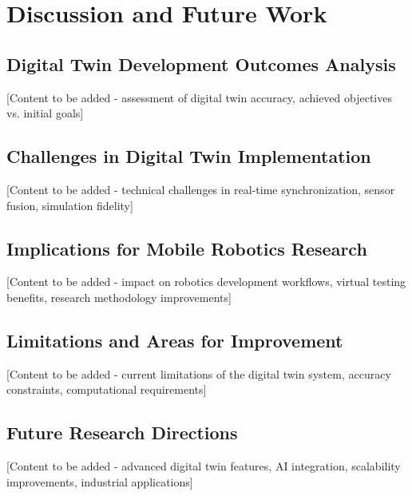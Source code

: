 \vspace{21.5pt}
\chapter{Discussion and Future Work}

\section{Digital Twin Development Outcomes Analysis}

[Content to be added - assessment of digital twin accuracy, achieved objectives vs. initial goals]

\section{Challenges in Digital Twin Implementation}

[Content to be added - technical challenges in real-time synchronization, sensor fusion, simulation fidelity]

\section{Implications for Mobile Robotics Research}

[Content to be added - impact on robotics development workflows, virtual testing benefits, research methodology improvements]

\section{Limitations and Areas for Improvement}

[Content to be added - current limitations of the digital twin system, accuracy constraints, computational requirements]

\section{Future Research Directions}

[Content to be added - advanced digital twin features, AI integration, scalability improvements, industrial applications]
